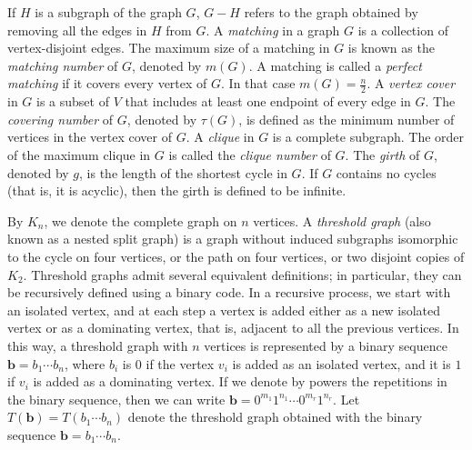 \documentclass[12pt]{article}
\theoremstyle{plain}
\theoremstyle{definition}
\begin{document}
 

If $H$ is a subgraph of the graph $G$, $G-H$ refers to the graph obtained by removing all the edges in $H$ from $G$. A {\em matching} in a graph $G$ is a collection of vertex-disjoint edges. The maximum size of a matching in $G$ is known as the {\em matching number} of $G$, denoted by $m(G)$. A matching is called a {\em perfect matching} if it covers every vertex of $G$. In that case $m(G)=\frac{n}{2}$. A {\em vertex cover} in $G$ is a subset of $V$ that includes at least one endpoint of every edge in $G$. The {\em covering number} of $G$, denoted by $\tau(G)$, is defined as the minimum number of vertices in the vertex cover of $G$. A {\em clique} in $G$ is a complete subgraph. The order of the maximum clique in $G$ is called the {\em clique number} of $G$. The {\em girth} of $G$, denoted by $g$, is the length of the shortest cycle in $G$. If $G$ contains no cycles (that is, it is acyclic), then the girth is defined to be infinite.
 
By $K_{n}$, we denote the complete graph on $n$ vertices. A {\em threshold graph} (also known as a nested split graph) is a graph without induced subgraphs isomorphic to the cycle on four vertices, or the path on four vertices, or two disjoint copies of $K_2$. Threshold graphs admit several equivalent definitions; in particular, they can be recursively defined using a binary code. In a recursive process, we start with an isolated vertex, and at each step a vertex is added either as a new isolated vertex or as a dominating vertex, that is, adjacent to all the previous vertices. In this way, a threshold graph with $n$ vertices is represented by a binary sequence $\mathbf{b}=b_1 \cdots b_n$, where $b_{i}$ is $0$ if the vertex $v_{i}$ is added as an isolated vertex, and it is $1$ if $v_{i}$ is added as a dominating vertex. If we denote by powers the repetitions in the binary sequence, then we can write $\mathbf{b}=0^{m_1}1^{n_1}\cdots 0^{m_r}1^{n_r}$. Let $T(\mathbf{b})=T(b_1\cdots b_n)$ denote the threshold graph obtained with the binary sequence $\mathbf{b}=b_1\cdots b_n$.
\end{document}
